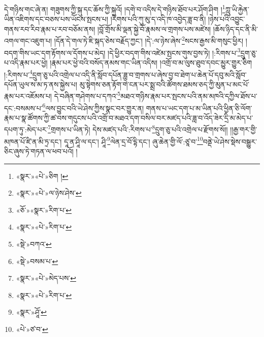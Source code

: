 དེ་གཉིས་གང་ཞེ་ན། གཟུགས་ཀྱི་སྐུ་དང་ཆོས་ཀྱི་སྐུའོ། །དགེ་བ་འདིས་དེ་གཉིས་ཐོབ་པར་ཤོག་ཤིག །\footnote{«སྣར་»«པེ་»ཅིག །}ཀླུ་ཡི་རྐྱེན་ཡིན་འཇིགས་དང་བཅས་པས་ཡོངས་སྤངས་པ། །རིགས་པའི་ཀུ་མུ་ད་འདི་ཁ་འབྱེད་ཟླ་བ་ནི། །ཉེས་པའི་འབྱུང་གནས་རབ་རིབ་རྣམ་པ་རབ་བཅོམ་ནས། །བློ་གྲོས་མི་ལྡན་སྐྱེ་བོ་རྣམས་ལ་གྲགས་པས་མཛེས། །ཆོས་ཉིད་དང་ནི་མི་འགལ་གང་འཇུག་པ། །དོན་དེ་གལ་ཏེ་ཇི་སྐད་ཅེས་བརྗོད་ཀྱང་། །དེ་:ལ་ཉེས་ཞེས་\footnote{«སྣར་»«པེ་»ལ་ཉེས་ཤེས་}སངས་རྒྱས་མི་གསུང་ཕྱིར། །བདག་གིས་ཡང་དག་རྟོགས་ལ་དོགས་པ་མེད། །དེ་ཕྱིར་བདག་གིས་འཛེམ་སྤངས་གུས་བྱས་ཏེ། །:རིགས་པ་\footnote{«ཅོ་»«སྣར་»རིག་པ་}དྲུག་ཅུ་པ་འདི་རྣམ་པར་ཕྱེ། །རྣམ་པར་ཕྱེ་བའི་བསོད་ནམས་གང་ཡིན་འདིས། །འགྲོ་བ་མ་ལུས་ཐུབ་དབང་མྱུར་གྱུར་ཅིག །:རིགས་པ་\footnote{«སྣར་»«པེ་»རིག་པ་}དྲུག་ཅུ་པའི་འགྲེལ་པ་འདི་ནི་སློབ་དཔོན་ཟླ་བ་གྲགས་པ་ཞེས་བྱ་བ་ཐེག་པ་ཆེན་པོ་དབུ་མའི་སློབ་དཔོན་ཡུལ་ས་མ་ཏ་ནས་སྐྱེས་པ། མུ་སྟེགས་ཅན་རྟོག་གེ་ངན་པར་སྨྲ་བའི་ཚོགས་ཐམས་ཅད་ཀྱི་མུན་པ་མང་པོ་རྣམ་པར་འཇོམས་པ། དེ་བཞིན་གཤེགས་པ་དཀའ་\footnote{«སྡེ་»བཀའ་}མཐའ་གཉིས་རྣམ་པར་སྤངས་པའི་ནམ་མཁའི་དཀྱིལ་ཐོས་པ་དང་:བསམས་པ་\footnote{«སྡེ་»བསམ་པ་}ལས་བྱུང་བའི་ཡེ་ཤེས་ཀྱིས་སྣང་བར་གྱུར་ན། གནས་པ་ཡང་དག་པ་མ་ཡིན་པའི་ཕྱིན་ཅི་ལོག་རྣམ་པ་སྣ་ཚོགས་ཀྱི་ཚ་བས་གདུངས་པའི་འགྲོ་བ་མཐའ་དག་བསིལ་བར་མཛད་པའི་ཟླ་བ་འོད་ཟེར་དྲི་མ་མེད་པ་དཔག་ཏུ་:མེད་པར་\footnote{«སྣར་»«པེ་»མེད་པས་}གྲགས་པ་ཡིན་ཏེ། དེས་མཛད་པའི་:རིགས་པ་\footnote{«སྣར་»«པེ་»རིག་པ་}དྲུག་ཅུ་པའི་འགྲེལ་པ་རྫོགས་སོ།། །།རྒྱ་གར་གྱི་མཁན་པོ་ཛི་ན་མི་ཏྲ་དང་། དཱ་ན་ཤཱི་ལ་དང་། ཤཱི་\footnote{«སྣར་»ཤཱོ་}ལེན་དྲ་བོ་དྷི་དང་། ཞུ་ཆེན་གྱི་ལོ་:ཙཱ་བ་\footnote{«པེ་»ཙ་བ་}བནྡེ་ཡེ་ཤེས་སྡེས་བསྒྱུར་ཅིང་ཞུས་ཏེ་གཏན་ལ་ཕབ་པའོ། ། 